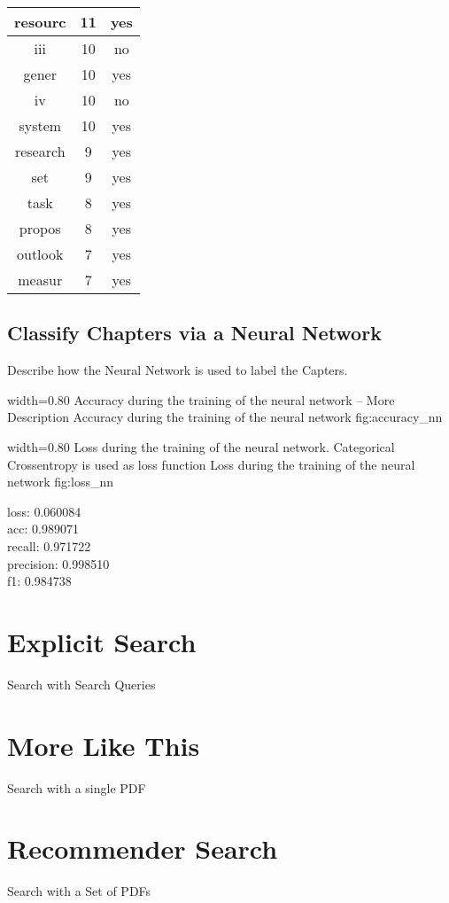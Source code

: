 \begin{tabular}{| c | c | c |}
resourc & 11 & yes \\ \hline
iii & 10 & no \\ \hline
gener & 10 & yes \\ \hline
iv & 10 & no \\ \hline
system & 10 & yes \\ \hline
research & 9 & yes \\ \hline
set & 9 & yes \\ \hline
task & 8 & yes \\ \hline
propos & 8 & yes \\ \hline
outlook & 7 & yes \\ \hline
measur & 7 & yes \\ \hline
\end{tabular}

\subsection{Classify Chapters via a Neural Network}
\label{subsec:creating-feature-vector}

Describe how the Neural Network is used to label the Capters.

      {width=0.80\textwidth}
      {Accuracy during the training of the neural network -- More Description}
      {Accuracy during the training of the neural network}
      {fig:accuracy_nn}

      {width=0.80\textwidth}
      {Loss during the training of the neural network. Categorical Crossentropy is used as loss function}
      {Loss during the training of the neural network}
      {fig:loss_nn}

loss: 0.060084        \\
acc: 0.989071         \\
recall: 0.971722      \\
precision: 0.998510   \\
f1: 0.984738










\section{Explicit Search}
\label{sec:explicit-search}

Search with Search Queries

\section{More Like This} %
\label{sec:more-like-this}

Search with a single PDF

\section{Recommender Search}
\label{sec:recommender-search}

Search with a Set of PDFs
